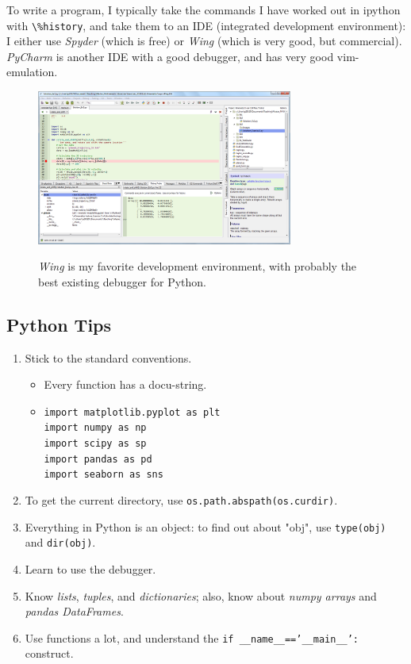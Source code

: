 To write a program, I typically take the commands I have worked out in ipython with \lstinline{\%history}, and take them to an IDE (integrated development environment): I either use \emph{Spyder} (which is free) or \emph{Wing} (which is very good, but commercial). \emph{PyCharm} is another IDE with a good debugger, and has very good vim-emulation.

\begin{figure}
  \centering
  \includegraphics[width=0.75\textwidth]{../Images/Wing.png}\\
  \caption{\emph{Wing} is my favorite development environment, with probably the best existing debugger for Python.}
\end{figure}

\subsection{Python Tips}

\begin{enumerate}
  \item Stick to the standard conventions.
      \begin{itemize}
        \item Every function has a docu-string.
        \item \texttt{import matplotlib.pyplot as plt}\\
            \texttt{import numpy as np}\\
            \texttt{import scipy as sp}\\
            \texttt{import pandas as pd}\\
            \texttt{import seaborn as sns}
      \end{itemize}
  \item To get the current directory, use \texttt{os.path.abspath(os.curdir)}.
  \item Everything in Python is an object: to find out about "obj", use \texttt{type(obj)} and \texttt{dir(obj)}.
  \item Learn to use the debugger.
  \item Know \emph{lists}, \emph{tuples}, and \emph{dictionaries}; also, know about \emph{numpy arrays} and \emph{pandas DataFrames}.
  \item Use functions a lot, and understand the \texttt{if \_\_name\_\_=='\_\_main\_\_':} construct.
\end{enumerate}

